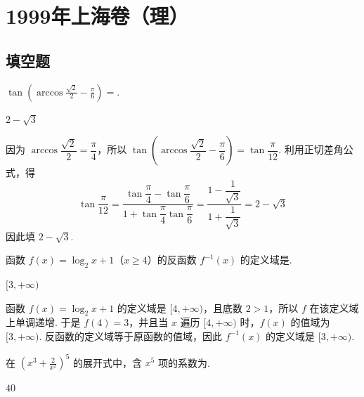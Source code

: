 \documentclass[UTF8,a4paper,oneside,11pt]{ctexbook}
\begin{document}
\mainmatter

\chapter{1999年上海卷（理）}
\section{填空题}

\begin{problem}
\(\tan\left(\arccos \frac{\sqrt{2}}{2} - \frac{\pi}{6}\right)=\)\fillinblank{}.
\end{problem}

\begin{answer}
\(2-\sqrt{3}\)
\end{answer}

\begin{solution}
因为 \(\arccos\dfrac{\sqrt2}{2}=\dfrac\pi4\)，所以
\(\tan\left(\arccos\dfrac{\sqrt2}{2}-\dfrac\pi6\right)=\tan\dfrac\pi{12}\). 利用正切差角公式，得
\[
\tan\dfrac\pi{12}=\frac{\tan\dfrac\pi4-\tan\dfrac\pi6}{1+\tan\dfrac\pi4\tan\dfrac\pi6}=\frac{1-\dfrac1{\sqrt3}}{1+\dfrac1{\sqrt3}}=2-\sqrt3
\]
因此填 \(2-\sqrt3\).
\end{solution}

\begin{problem}
函数 \(f(x)=\log_2 x+1\)（\(x\geqslant 4\)）的反函数 \(f^{-1}(x)\) 的定义域是\fillinblank{}.
\end{problem}

\begin{answer}
\([3,+\infty)\)
\end{answer}

\begin{solution}
函数 \(f(x)=\log_2x+1\) 的定义域是 \([4,+\infty)\)，且底数 \(2>1\)，所以 \(f\) 在该定义域上单调递增. 于是 \(f(4)=3\)，并且当 \(x\) 遍历 \([4,+\infty)\) 时，\(f(x)\) 的值域为 \([3,+\infty)\). 反函数的定义域等于原函数的值域，因此 \(f^{-1}(x)\) 的定义域是 \([3,+\infty)\).
\end{solution}

\begin{problem}
在 \(\left( x^3 + \frac{2}{x^2} \right)^5\) 的展开式中，含 \(x^5\) 项的系数为\fillinblank{}.
\end{problem}

\begin{answer}
\(40\)
\end{answer}
\end{document}

